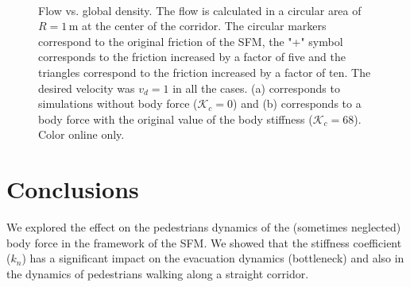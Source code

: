 \documentclass[preprint,12pt]{elsarticle}
\begin{document}
\begin{figure}[!htbp]
\centering
    \ 
    \\
\caption[width=0.47\columnwidth]{Flow vs. global density. The flow is calculated in a circular area of $R=1\,$m at the center of the corridor. The circular markers correspond to the original friction of the SFM, the "+" symbol corresponds to the friction increased by a factor of five and the triangles correspond to the friction increased by a factor of ten. The desired velocity was $v_d=1$ in all the cases. (a) corresponds to simulations without body force ($\mathcal{K}_c =$0) and (b) corresponds to a body force with the original value of the body stiffness ($\mathcal{K}_c =$68). Color online only.}
\label{flow_density}
\end{figure}



\section{\label{conclusions}Conclusions}


We explored the effect on the pedestrians dynamics of the (sometimes neglected) body force in the framework of the SFM. We showed that the stiffness coefficient ($k_n$) has a significant impact on the evacuation dynamics (bottleneck) and also in the dynamics of pedestrians walking along a straight corridor.\\
\end{document}
